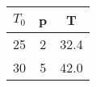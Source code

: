 \begin{tabular}[12pt]{ |c| c| c|}
    \hline
    \textbf{$T_0$} & \textbf{p} & \textbf{T} \\ 
    \hline
   25 & 2 & 32.4 \\
    \hline 
   30 & 5 & 42.0\\
    \hline    
    \end{tabular}
